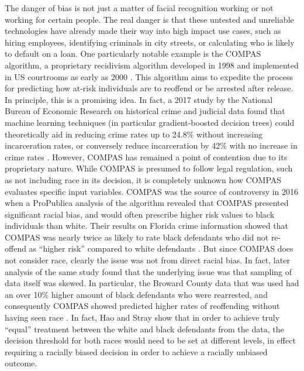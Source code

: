 \documentclass[10pt]{article}
\begin{document}
  The danger of bias is not just a matter of facial recognition working or not working for certain people. The real danger is that these untested and unreliable technologies have already made their way into high impact use cases, such as hiring employees, identifying criminals in city streets, or calculating who is likely to default on a loan. One particularly notable example is the COMPAS algorithm, a proprietary recidivism algorithm developed in 1998 and implemented in US courtrooms as early as 2000 \cite{taylor2020ai}. This algorithm aims to expedite the process for predicting how at-risk individuals are to reoffend or be arrested after release. In principle, this is a promising idea. In fact, a 2017 study by the National Bureau of Economic Research on historical crime and judicial data found that machine learning techniques (in particular gradient-boosted decision trees) could theoretically aid in reducing crime rates up to 24.8\% without increasing incarceration rates, or conversely reduce incarceration by 42\% with no increase in crime rates \cite{kleinberg2018human}. However, COMPAS has remained a point of contention due to its proprietary nature. While COMPAS is presumed to follow legal regulation, such as not including race in its decision, it is completely unknown how COMPAS evaluates specific input variables. COMPAS was the source of controversy in 2016 when a ProPublica analysis of the algorithm revealed that COMPAS presented significant racial bias, and would often prescribe higher risk values to black individuals than white. Their results on Florida crime information showed that COMPAS was nearly twice as likely to rate black defendants who did not re-offend as “higher risk” compared to white defendants \cite{angwin2016machine}. But since COMPAS does not consider race, clearly the issue was not from direct racial bias. In fact, later analysis of the same study found that the underlying issue was that sampling of data itself was skewed. In particular, the Broward County data that was used had an over 10\% higher amount of black defendants who were rearrested, and consequently COMPAS showed predicted higher rates of reoffending without having seen race \cite{hao2019can}. In fact, Hao and Stray show that in order to achieve truly “equal” treatment between the white and black defendants from the data, the decision threshold for both races would need to be set at different levels, in effect requiring a racially biased decision in order to achieve a racially unbiased outcome.
\end{document}
